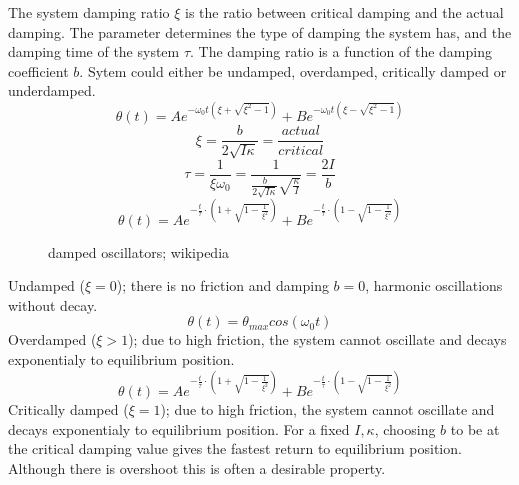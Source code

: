 \documentclass[\main/master.tex]{subfiles}
\begin{document}
The system damping ratio $\xi$ is the ratio between critical damping and the actual damping. The parameter determines the type of damping the system has, and the damping time of the system $\tau$. The damping ratio is a function of the damping coefficient $b$. Sytem could either be undamped, overdamped, critically damped or underdamped.
\begin{equation}
\theta(t) = Ae^{-\omega_0 t(\xi+\sqrt{\xi^2-1})} + Be^{-\omega_0 t(\xi-\sqrt{\xi^2-1})}    \label{eqn:damped_motion_equation}
\end{equation} 
\begin{equation}
\xi = \frac{b}{2\sqrt{I\kappa}} = \frac{actual}{critical}  \label{eqn:damped_motion_equation}
\end{equation}
\begin{equation}
\tau = \frac{1}{\xi\omega_0} = \frac{1}{\frac{b}{2\sqrt{I\kappa}}\sqrt{\frac{\kappa}{I}} }= \frac{2I}{b}  \label{eqn:damping_time}
\end{equation}
\begin{equation}
\theta(t) = Ae^{-\frac{t}{\tau}\cdot(1+\sqrt{1-\frac{1}{\xi^2}})} + Be^{-\frac{t}{\tau}\cdot(1-\sqrt{1-\frac{1}{\xi^2}})}    \label{eqn:damped_motion_equation}
\end{equation}
\begin{figure}[htbp]
	\centering
	\caption[damped]{damped oscillators; wikipedia}
	\label{fig:damped_oscillators}
\end{figure}



Undamped ($\xi = 0$); there is no friction and damping $b = 0$, harmonic oscillations without decay.
\begin{equation}
\theta(t) = \theta_{max}cos(\omega_0 t )    \label{eqn:undamped_motion_equation}
\end{equation}
Overdamped ($\xi > 1$); due to high friction, the system cannot oscillate and decays exponentialy to equilibrium position.
\begin{equation}
\theta(t) = Ae^{-\frac{t}{\tau}\cdot(1+\sqrt{1-\frac{1}{\xi^2}})} + Be^{-\frac{t}{\tau}\cdot(1-\sqrt{1-\frac{1}{\xi^2}})}    \label{eqn:overdamped_motion_equation}
\end{equation}
Critically damped ($\xi = 1$); due to high friction, the system cannot oscillate and decays exponentialy to equilibrium position. For a fixed $I, \kappa$, choosing $b$ to be at the critical damping value gives
the fastest return to equilibrium position. Although there is overshoot this is often a desirable property.
\end{document}
